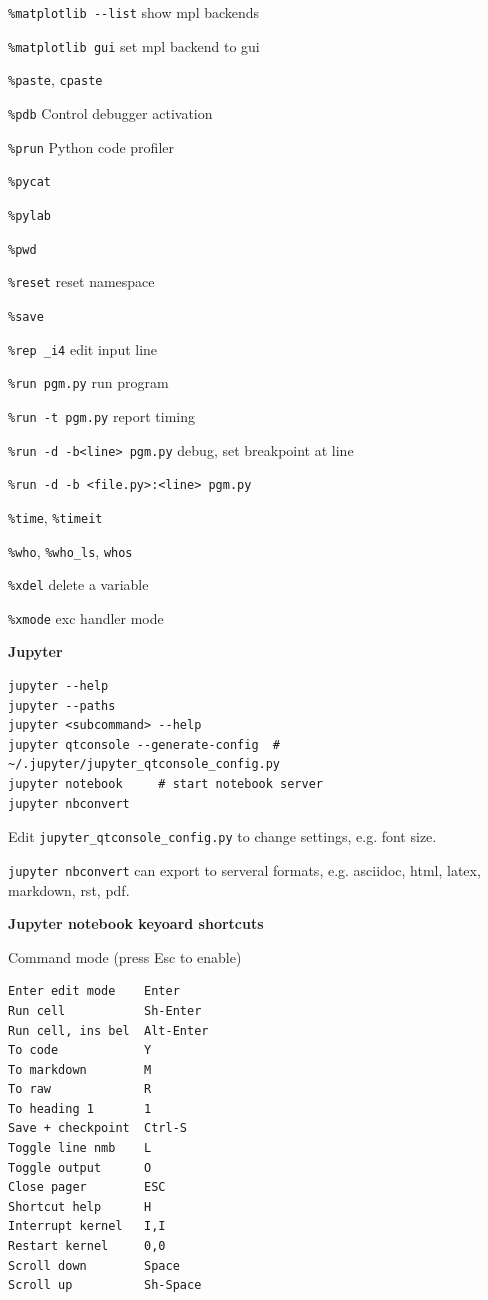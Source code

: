 \documentclass[9pt,a4wide]{extarticle}
\begin{document}
\begin{multicols}{3}
{\tt \%matplotlib -{}-list} show mpl backends

{\tt \%matplotlib gui} set mpl backend to gui

{\tt \%paste}, {\tt cpaste}

{\tt \%pdb} Control debugger activation

{\tt \%prun} Python code profiler

{\tt \%pycat}

{\tt \%pylab}

{\tt \%pwd}

{\tt \%reset} \rval reset namespace

{\tt \%save}

{\tt \%rep \_i4} \rval edit input line

{\tt \%run pgm.py} \rval run program

{\tt \%run -t pgm.py} \rval report timing

{\tt \%run -d -b<line> pgm.py} \rval debug, set breakpoint at line

{\tt \%run -d -b <file.py>:<line> pgm.py}

{\tt \%time}, {\tt \%timeit}

{\tt \%who}, {\tt \%who\_ls}, {\tt whos}

{\tt \%xdel} delete a variable

{\tt \%xmode} exc handler mode

\end{multicols}

\medskip




\medskip
{\bf Jupyter}

\begin{verbatim}
jupyter --help
jupyter --paths
jupyter <subcommand> --help
jupyter qtconsole --generate-config  # ~/.jupyter/jupyter_qtconsole_config.py
jupyter notebook     # start notebook server
jupyter nbconvert    
\end{verbatim}

Edit {\tt jupyter\_qtconsole\_config.py} to change settings, e.g. font size.

{\tt jupyter nbconvert} can export to serveral formats, e.g. asciidoc, html,
latex, markdown, rst, pdf.

\medskip

{\bf Jupyter notebook keyoard shortcuts}

Command mode (press Esc to enable)

\begin{verbatim}      
Enter edit mode    Enter
Run cell           Sh-Enter
Run cell, ins bel  Alt-Enter
To code            Y
To markdown        M
To raw             R
To heading 1       1
Save + checkpoint  Ctrl-S
Toggle line nmb    L
Toggle output      O
Close pager        ESC
Shortcut help      H
Interrupt kernel   I,I
Restart kernel     0,0
Scroll down        Space
Scroll up          Sh-Space
\end{verbatim}      
\end{document}
